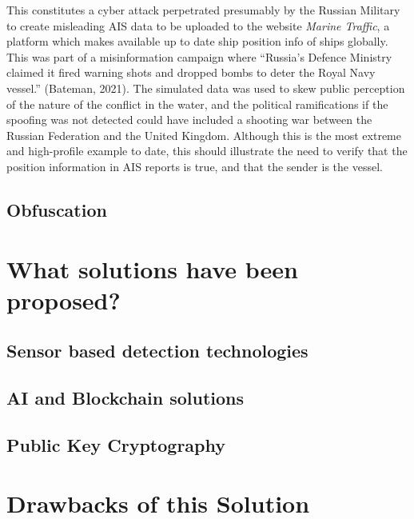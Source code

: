 \documentclass[
]{article}
\begin{document}
This constitutes a cyber attack perpetrated presumably by the Russian
Military to create misleading AIS data to be uploaded to the website
\emph{Marine Traffic}, a platform which makes available up to date ship
position info of ships globally. This was part of a misinformation
campaign where ``Russia's Defence Ministry claimed it fired warning
shots and dropped bombs to deter the Royal Navy vessel.'' (Bateman,
2021). The simulated data was used to skew public perception of the
nature of the conflict in the water, and the political ramifications if
the spoofing was not detected could have included a shooting war between
the Russian Federation and the United Kingdom. Although this is the most
extreme and high-profile example to date, this should illustrate the
need to verify that the position information in AIS reports is true, and
that the sender is the vessel.

\hypertarget{obfuscation}{%
\subsection{Obfuscation}\label{obfuscation}}

\hypertarget{what-solutions-have-been-proposed}{%
\section{What solutions have been
proposed?}\label{what-solutions-have-been-proposed}}

\hypertarget{sensor-based-detection-technologies}{%
\subsection{Sensor based detection
technologies}\label{sensor-based-detection-technologies}}

\hypertarget{ai-and-blockchain-solutions}{%
\subsection{AI and Blockchain
solutions}\label{ai-and-blockchain-solutions}}

\hypertarget{public-key-cryptography}{%
\subsection{Public Key Cryptography}\label{public-key-cryptography}}

\hypertarget{drawbacks-of-this-solution}{%
\section{Drawbacks of this Solution}\label{drawbacks-of-this-solution}}
\end{document}
